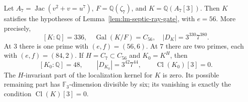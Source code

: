 \begin{proposition}
\label{prop:lm-septic-residual-gate}
Let $A_7=\operatorname{Jac}(v^2+v=u^7)$,
$F=\mathbb Q(\zeta_7)$, and $K=\mathbb Q(A_7[3])$.
Then $K$ satisfies the hypotheses of
Lemma~\ref{lem:lm-septic-ray-gate}, with $e=56$.
More precisely,
\[
 [K:\mathbb Q]=336,\quad\operatorname{Gal}(K/F)=C_{56},
 \quad |D_K|=3^{330}7^{380}.
\]
At $3$ there is one prime with $(e,f)=(56,6)$.
At $7$ there are two primes, each with $(e,f)=(84,2)$.
If $H=C_7\subset C_{56}$ and $K_0=K^H$, then
\[
 [K_0:\mathbb Q]=48,\qquad |D_{K_0}|=3^{42}7^{44},
 \qquad\operatorname{Cl}(K_0)[3]=0.
\]
The $H$-invariant part of the localization kernel for $K$
is zero.  Its possible remaining part has
$\mathbb F_3$-dimension divisible by six; its vanishing
is exactly the condition
$\operatorname{Cl}(K)[3]=0$.
\end{proposition}
